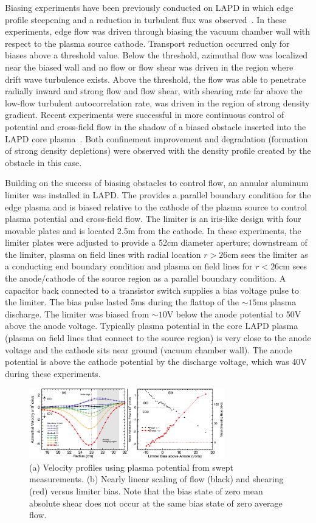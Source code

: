 \documentclass[aps,prl,amsmath,amssymb,preprint,superscriptaddress]{revtex4}
\begin{document}
Biasing experiments have been previously conducted on LAPD in which edge profile steepening and a reduction in turbulent flux was observed~\cite{maggs07,carter09}. In these experiments, edge flow was driven through biasing the vacuum chamber wall with respect to the plasma source cathode.  Transport reduction occurred only for biases above a threshold value.  Below the threshold, azimuthal flow was localized near the biased wall and no flow or flow shear was driven in the region where drift wave turbulence exists.  Above the threshold, the flow was able to penetrate radially inward and strong flow and flow shear, with shearing rate far above the low-flow turbulent autocorrelation rate, was driven in the region of strong density gradient.   Recent experiments were successful in more continuous control of potential and cross-field flow in the shadow of a biased obstacle inserted into the LAPD core plasma~\cite{zhou12}.  Both confinement improvement and degradation (formation of strong density depletions) were observed with the density profile created by the obstacle in this case.  

Building on the success of biasing obstacles to control flow, an annular aluminum limiter was installed in LAPD. The provides a parallel boundary condition for the edge plasma and is biased relative to the cathode of the plasma source to control plasma potential and cross-field flow.  The limiter is
an iris-like design with four movable plates and is located 2.5m from
the cathode.  In these experiments, the limiter plates were adjusted
to provide a 52cm diameter aperture; downstream of the
limiter, plasma on field lines with radial location $r>26$cm sees the
limiter as a conducting end boundary condition and plasma on field
lines for $r<26$cm sees the anode/cathode of the source region as a
parallel boundary condition.  A capacitor back connected to a transistor switch supplies a bias voltage pulse to the limiter.  The
bias pulse lasted 5ms during the flattop of the $\sim 15$ms plasma
discharge. The limiter was biased from $\sim 10$V below the anode
potential to 50V above the anode voltage.  Typically plasma potential
in the core LAPD plasma (plasma on field lines that connect to the
source region) is very close to the anode voltage and the cathode sits
near ground (vacuum chamber wall).  The anode potential is above the
cathode potential by the discharge voltage, which was 40V during these experiments.

\begin{figure}[!htbp]
\centerline{
\includegraphics[width=8.5cm]{velocity_flowshear.pdf}}
\caption{\label{fig:velocity_flowshear} (a) Velocity profiles using plasma potential from swept measurements. (b) Nearly linear scaling of flow (black) and shearing (red) versus limiter bias. Note that the bias state of zero mean absolute shear does not occur at the same bias state of zero average flow.}
\end{figure}
\end{document}

